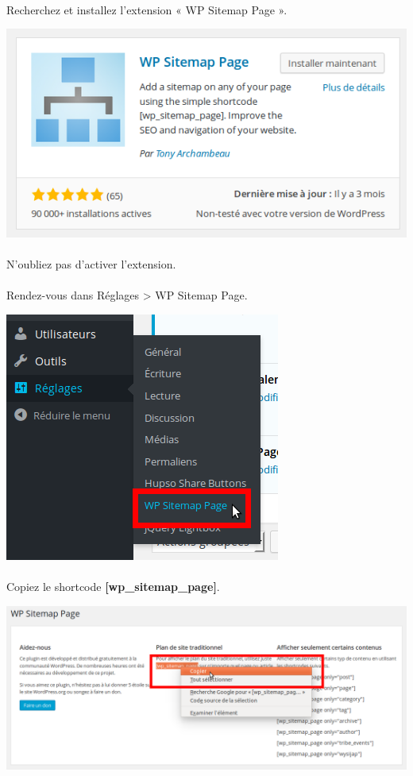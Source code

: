 \documentclass[10pt,a4paper]{article}
\begin{document}
\paragraph{}Recherchez et installez l'extension « WP Sitemap Page ».
\begin{center}
\includegraphics[scale=0.3]{img/0264.png}
\end{center}
\paragraph{}N'oubliez pas d'activer l'extension.
\paragraph{}Rendez-vous dans Réglages > WP Sitemap Page.
\begin{center}
\includegraphics[scale=0.3]{img/0265.png}
\end{center}
\paragraph{}Copiez le shortcode \textbf{[wp\_sitemap\_page]}.
\begin{center}
\includegraphics[scale=0.3]{img/0266.png}
\end{center}
\newpage
\end{document}
